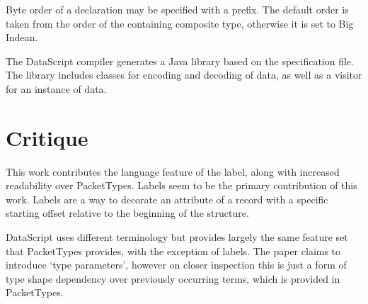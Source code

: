 Byte order of a declaration may be specified with a prefix. The default order is
taken from the order of the containing composite type, otherwise it is set to
Big Indean.

The DataScript compiler generates a Java library based on the specification
file. The library includes classes for encoding and decoding of data, as well
as a visitor for an instance of data.

\section{Critique}

This work contributes the language feature of the label, along with increased
readability over PacketTypes. Labels seem to be the primary contribution of this
work. Labels are a way to decorate an attribute of a record with a specific
starting offset relative to the beginning of the structure.

DataScript uses different terminology but provides largely the
same feature set that PacketTypes provides, with the exception
of labels. The paper claims to introduce `type parameters', however
on closer inspection this is just a form of type shape dependency
over previously occurring terms, which is provided in PacketTypes.

